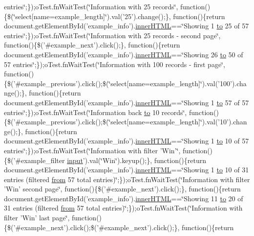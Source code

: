 \begin{DoxyCompactItemize}
entries\char`\"{};\});o\+Test.\+fn\+Wait\+Test(\char`\"{}Information with 25 records\char`\"{}, function()\{\$(\char`\"{}select\mbox{[}name=example\+\_\+length\mbox{]}\char`\"{}).val('25').change();\}, function()\{return document.\+get\+Element\+By\+Id('example\+\_\+info').\hyperlink{jquery-ui_8js_a87f73c4f0391c1cf9fe60374a76d9a7b}{inner\+H\+T\+M\+L}==\char`\"{}Showing 1 \hyperlink{jquery-ui_8js_af6086621f45baa2cf538f19e45d3c263}{to} 25 of 57 entries\char`\"{};\});o\+Test.\+fn\+Wait\+Test(\char`\"{}Information with 25 records -\/ second page\char`\"{}, function()\{\$('\#example\+\_\+next').click();\}, function()\{return document.\+get\+Element\+By\+Id('example\+\_\+info').\hyperlink{jquery-ui_8js_a87f73c4f0391c1cf9fe60374a76d9a7b}{inner\+H\+T\+M\+L}==\char`\"{}Showing 26 \hyperlink{jquery-ui_8js_af6086621f45baa2cf538f19e45d3c263}{to} 50 of 57 entries\char`\"{};\});o\+Test.\+fn\+Wait\+Test(\char`\"{}Information with 100 records -\/ first page\char`\"{}, function()\{\$('\#example\+\_\+previous').click();\$(\char`\"{}select\mbox{[}name=example\+\_\+length\mbox{]}\char`\"{}).val('100').change();\}, function()\{return document.\+get\+Element\+By\+Id('example\+\_\+info').\hyperlink{jquery-ui_8js_a87f73c4f0391c1cf9fe60374a76d9a7b}{inner\+H\+T\+M\+L}==\char`\"{}Showing 1 \hyperlink{jquery-ui_8js_af6086621f45baa2cf538f19e45d3c263}{to} 57 of 57 entries\char`\"{};\});o\+Test.\+fn\+Wait\+Test(\char`\"{}Information back \hyperlink{jquery-ui_8js_af6086621f45baa2cf538f19e45d3c263}{to} 10 records\char`\"{}, function()\{\$('\#example\+\_\+previous').click();\$(\char`\"{}select\mbox{[}name=example\+\_\+length\mbox{]}\char`\"{}).val('10').change();\}, function()\{return document.\+get\+Element\+By\+Id('example\+\_\+info').\hyperlink{jquery-ui_8js_a87f73c4f0391c1cf9fe60374a76d9a7b}{inner\+H\+T\+M\+L}==\char`\"{}Showing 1 \hyperlink{jquery-ui_8js_af6086621f45baa2cf538f19e45d3c263}{to} 10 of 57 entries\char`\"{};\});o\+Test.\+fn\+Wait\+Test(\char`\"{}Information with filter 'Win'\char`\"{}, function()\{\$('\#example\+\_\+filter \hyperlink{validate_8js_a07a2aabd64594dc36dd810cad2669deb}{input}').val(\char`\"{}Win\char`\"{}).keyup();\}, function()\{return document.\+get\+Element\+By\+Id('example\+\_\+info').\hyperlink{jquery-ui_8js_a87f73c4f0391c1cf9fe60374a76d9a7b}{inner\+H\+T\+M\+L}==\char`\"{}Showing 1 \hyperlink{jquery-ui_8js_af6086621f45baa2cf538f19e45d3c263}{to} 10 of 31 entries (filtered \hyperlink{jquery-ui_8js_ace03b192fd101a1c5648340bc09b7229}{from} 57 total entries)\char`\"{};\});o\+Test.\+fn\+Wait\+Test(\char`\"{}Information with filter 'Win' second page\char`\"{}, function()\{\$('\#example\+\_\+next').click();\}, function()\{return document.\+get\+Element\+By\+Id('example\+\_\+info').\hyperlink{jquery-ui_8js_a87f73c4f0391c1cf9fe60374a76d9a7b}{inner\+H\+T\+M\+L}==\char`\"{}Showing 11 \hyperlink{jquery-ui_8js_af6086621f45baa2cf538f19e45d3c263}{to} 20 of 31 entries (filtered \hyperlink{jquery-ui_8js_ace03b192fd101a1c5648340bc09b7229}{from} 57 total entries)\char`\"{};\});o\+Test.\+fn\+Wait\+Test(\char`\"{}Information with filter 'Win' last page\char`\"{}, function()\{\$('\#example\+\_\+next').click();\$('\#example\+\_\+next').click();\}, function()\{return 
\end{DoxyCompactItemize}

